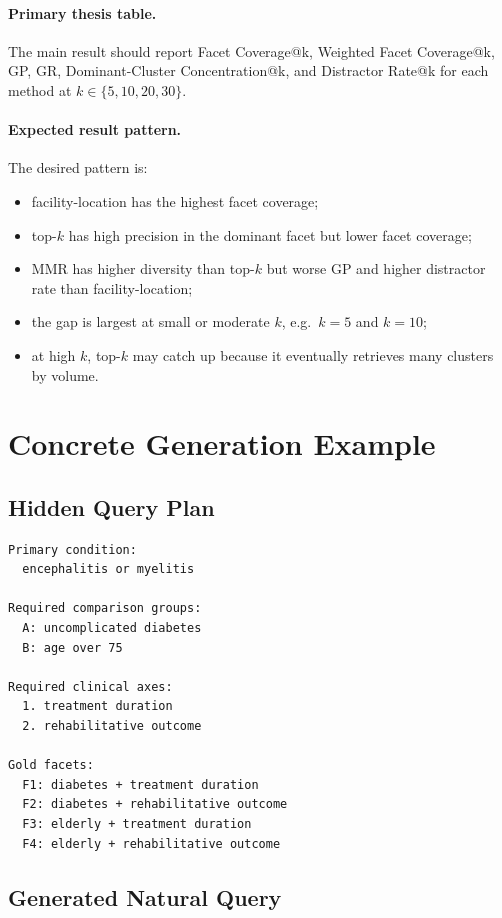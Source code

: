 \documentclass[11pt,a4paper]{article}
\begin{document}
\paragraph{Primary thesis table.}
The main result should report Facet Coverage@k, Weighted Facet Coverage@k, GP, GR, Dominant-Cluster Concentration@k, and Distractor Rate@k for each method at $k \in \{5,10,20,30\}$.

\paragraph{Expected result pattern.}
The desired pattern is:

\begin{itemize}[leftmargin=*]
	\item facility-location has the highest facet coverage;
	\item top-$k$ has high precision in the dominant facet but lower facet coverage;
	\item MMR has higher diversity than top-$k$ but worse GP and higher distractor rate than facility-location;
	\item the gap is largest at small or moderate $k$, e.g.\ $k=5$ and $k=10$;
	\item at high $k$, top-$k$ may catch up because it eventually retrieves many clusters by volume.
\end{itemize}

\section{Concrete Generation Example}

\subsection{Hidden Query Plan}

\begin{lstlisting}[style=promptstyle]
Primary condition:
  encephalitis or myelitis

Required comparison groups:
  A: uncomplicated diabetes
  B: age over 75

Required clinical axes:
  1. treatment duration
  2. rehabilitative outcome

Gold facets:
  F1: diabetes + treatment duration
  F2: diabetes + rehabilitative outcome
  F3: elderly + treatment duration
  F4: elderly + rehabilitative outcome
\end{lstlisting}

\subsection{Generated Natural Query}
\end{document}
